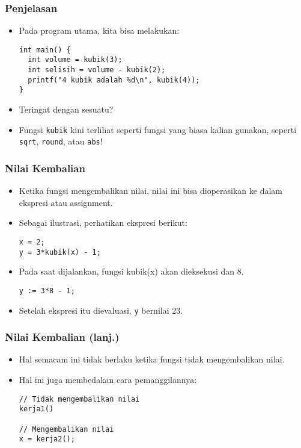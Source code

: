\begin{frame}[fragile]
\frametitle{Penjelasan}
\begin{itemize}
  \item Pada program utama, kita bisa melakukan:
\begin{lstlisting}
int main() {
  int volume = kubik(3);
  int selisih = volume - kubik(2);
  printf("4 kubik adalah %d\n", kubik(4));
}
\end{lstlisting}
  \item Teringat dengan sesuatu?
  \item Fungsi \texttt{kubik} kini terlihat seperti fungsi yang biasa kalian gunakan, seperti \texttt{sqrt}, \texttt{round}, atau \texttt{abs}!
\end{itemize}
\end{frame}

\begin{frame}[fragile]
\frametitle{Nilai Kembalian}
\begin{itemize}
  \item Ketika fungsi mengembalikan nilai, nilai ini bisa dioperasikan ke dalam ekspresi atau assignment.
  \item Sebagai ilustrasi, perhatikan ekspresi berikut:
\begin{lstlisting}
x = 2;
y = 3*kubik(x) - 1;
\end{lstlisting}
  \item Pada saat dijalankan, fungsi kubik(x) akan dieksekusi dan  8.
\begin{lstlisting}
y := 3*8 - 1;
\end{lstlisting}
  \item Setelah ekspresi itu dievaluasi, \texttt{y} bernilai 23.
\end{itemize}
\end{frame}

\begin{frame}[fragile]
\frametitle{Nilai Kembalian (lanj.)}
\begin{itemize}
  \item Hal semacam ini tidak berlaku ketika fungsi tidak mengembalikan nilai.
  \item Hal ini juga membedakan cara pemanggilannya:
\begin{lstlisting}
// Tidak mengembalikan nilai
kerja1()

// Mengembalikan nilai
x = kerja2();
\end{lstlisting}
\end{itemize}
\end{frame}


